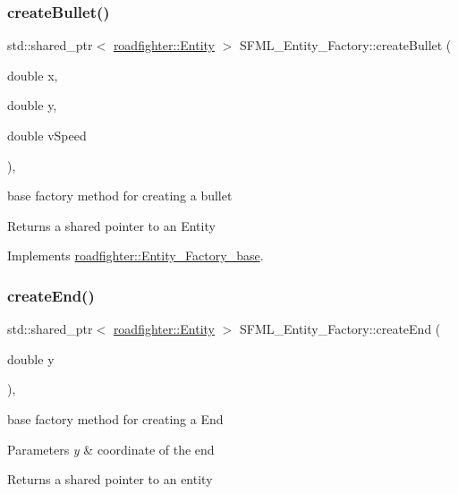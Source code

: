 \subsubsection{\texorpdfstring{create\+Bullet()}{createBullet()}}
{\footnotesize\ttfamily std\+::shared\+\_\+ptr$<$ \hyperlink{classroadfighter_1_1Entity}{roadfighter\+::\+Entity} $>$ S\+F\+M\+L\+\_\+\+Entity\+\_\+\+Factory\+::create\+Bullet (\begin{DoxyParamCaption}\item[{double}]{x,  }\item[{double}]{y,  }\item[{double}]{v\+Speed }\end{DoxyParamCaption})\hspace{0.3cm}{\ttfamily [override]}, {\ttfamily [virtual]}}

base factory method for creating a bullet \begin{DoxyReturn}{Returns}
a shared pointer to an Entity 
\end{DoxyReturn}


Implements \hyperlink{classroadfighter_1_1Entity__Factory__base_a5241bdb886a9f1b086d009a0f6478045}{roadfighter\+::\+Entity\+\_\+\+Factory\+\_\+base}.

\mbox{\label{classSFML__Entity__Factory_af484c4ae7c9a82c171eb047fb05aa350}} 
\subsubsection{\texorpdfstring{create\+End()}{createEnd()}}
{\footnotesize\ttfamily std\+::shared\+\_\+ptr$<$ \hyperlink{classroadfighter_1_1Entity}{roadfighter\+::\+Entity} $>$ S\+F\+M\+L\+\_\+\+Entity\+\_\+\+Factory\+::create\+End (\begin{DoxyParamCaption}\item[{double}]{y }\end{DoxyParamCaption})\hspace{0.3cm}{\ttfamily [override]}, {\ttfamily [virtual]}}

base factory method for creating a End 
\begin{DoxyParams}{Parameters}
{\em y} & coordinate of the end \\
\hline
\end{DoxyParams}
\begin{DoxyReturn}{Returns}
a shared pointer to an entity 
\end{DoxyReturn}


